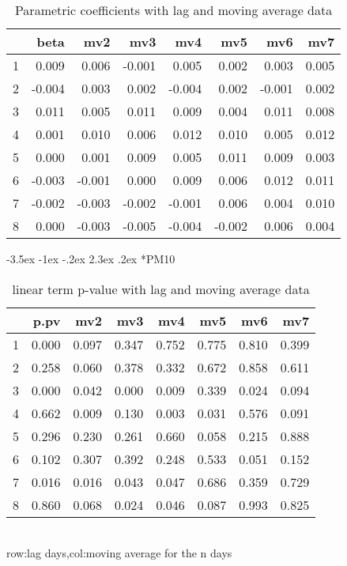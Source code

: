 \documentclass[a4paper, 12pt]{article}
\makeatletter
\def\large{\fontsize{14}{20}\selectfont}
\renewcommand\subsection{\@startsection {subsection}{1}{\z@}%
                                   {-3.5ex \@plus -1ex \@minus -.2ex}%
                                   {2.3ex \@plus.2ex}%
                                   {\centering\normalfont\large\bfseries}}
\makeatother
\begin{document}
\begin{table}[h]
\centering
\caption{Parametric coefficients with lag and moving average data}
\begin{tabular}{rrrrrrrr}
  \hline
 & beta & mv2 & mv3 & mv4 & mv5 & mv6 & mv7 \\
  \hline
1 & 0.009 & 0.006 & -0.001 & 0.005 & 0.002 & 0.003 & 0.005 \\
  2 & -0.004 & 0.003 & 0.002 & -0.004 & 0.002 & -0.001 & 0.002 \\
  3 & 0.011 & 0.005 & 0.011 & 0.009 & 0.004 & 0.011 & 0.008 \\
  4 & 0.001 & 0.010 & 0.006 & 0.012 & 0.010 & 0.005 & 0.012 \\
  5 & 0.000 & 0.001 & 0.009 & 0.005 & 0.011 & 0.009 & 0.003 \\
  6 & -0.003 & -0.001 & 0.000 & 0.009 & 0.006 & 0.012 & 0.011 \\
  7 & -0.002 & -0.003 & -0.002 & -0.001 & 0.006 & 0.004 & 0.010 \\
  8 & 0.000 & -0.003 & -0.005 & -0.004 & -0.002 & 0.006 & 0.004 \\
   \hline
\end{tabular}
\end{table}
\clearpage
\subsection*{PM10}
\begin{table}[h]
\centering
\caption{linear term p-value with lag and moving average data}
\begin{tabular}{rrrrrrrr}
  \hline
 & p.pv & mv2 & mv3 & mv4 & mv5 & mv6 & mv7 \\
  \hline
1 & 0.000 & 0.097 & 0.347 & 0.752 & 0.775 & 0.810 & 0.399 \\
  2 & 0.258 & 0.060 & 0.378 & 0.332 & 0.672 & 0.858 & 0.611 \\
  3 & 0.000 & 0.042 & 0.000 & 0.009 & 0.339 & 0.024 & 0.094 \\
  4 & 0.662 & 0.009 & 0.130 & 0.003 & 0.031 & 0.576 & 0.091 \\
  5 & 0.296 & 0.230 & 0.261 & 0.660 & 0.058 & 0.215 & 0.888 \\
  6 & 0.102 & 0.307 & 0.392 & 0.248 & 0.533 & 0.051 & 0.152 \\
  7 & 0.016 & 0.016 & 0.043 & 0.047 & 0.686 & 0.359 & 0.729 \\
  8 & 0.860 & 0.068 & 0.024 & 0.046 & 0.087 & 0.993 & 0.825 \\
   \hline
\end{tabular}
\\row:lag days,col:moving average for the n days
\end{table}
\end{document}
